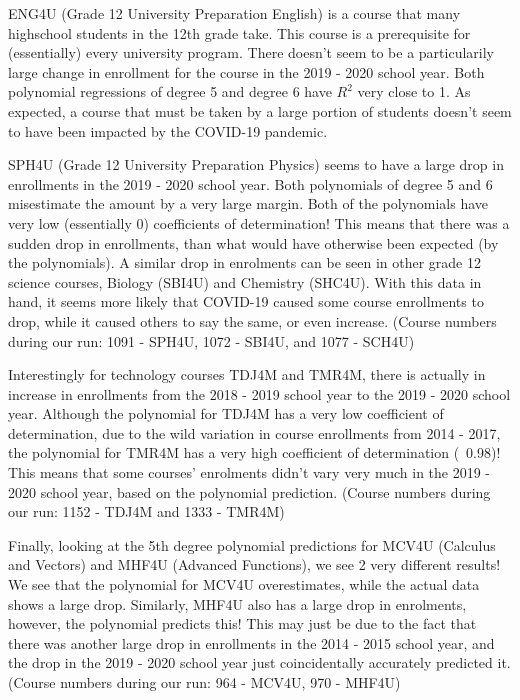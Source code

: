\documentclass[fontsize=11pt]{article}
\begin{document}
ENG4U (Grade 12 University Preparation English) is a course that many highschool students in the 12th grade take.
This course is a prerequisite for (essentially) every university program.
There doesn't seem to be a particularily large change in enrollment for the course in the 2019 - 2020 school year.
Both polynomial regressions of degree 5 and degree 6 have $R^2$ very close to 1.
As expected, a course that must be taken by a large portion of students doesn't seem to have been
impacted by the COVID-19 pandemic.

SPH4U (Grade 12 University Preparation Physics) seems to have a large drop in enrollments in the 2019 - 2020 school year.
Both polynomials of degree 5 and 6 misestimate the amount by a very large margin.
Both of the polynomials have very low (essentially 0) coefficients of determination!
This means that there was a sudden drop in enrollments, than what would have otherwise been expected (by the polynomials).
A similar drop in enrolments can be seen in other grade 12 science courses, Biology (SBI4U) and Chemistry (SHC4U).
With this data in hand, it seems more likely that COVID-19 caused some course enrollments to drop,
while it caused others to say the same, or even increase.
(Course numbers during our run: 1091 - SPH4U, 1072 - SBI4U, and 1077 - SCH4U)

Interestingly for technology courses TDJ4M and TMR4M, there is actually in increase in enrollments
from the 2018 - 2019 school year to the 2019 - 2020 school year.
Although the polynomial for TDJ4M has a very low coefficient of determination, due to the wild variation
in course enrollments from 2014 - 2017, the polynomial for TMR4M has a very high coefficient of determination (~0.98)!
This means that some courses' enrolments didn't vary very much in the 2019 - 2020 school year, based
on the polynomial prediction.
(Course numbers during our run: 1152 - TDJ4M and 1333 - TMR4M)

Finally, looking at the 5th degree polynomial predictions for MCV4U (Calculus and Vectors) and MHF4U (Advanced Functions),
we see 2 very different results!
We see that the polynomial for MCV4U overestimates, while the actual data shows a large drop.
Similarly, MHF4U also has a large drop in enrolments, however, the polynomial predicts this!
This may just be due to the fact that there was another large drop in enrollments in the 2014 - 2015 school year,
and the drop in the 2019 - 2020 school year just coincidentally accurately predicted it.
(Course numbers during our run: 964 - MCV4U, 970 - MHF4U)
\end{document}
